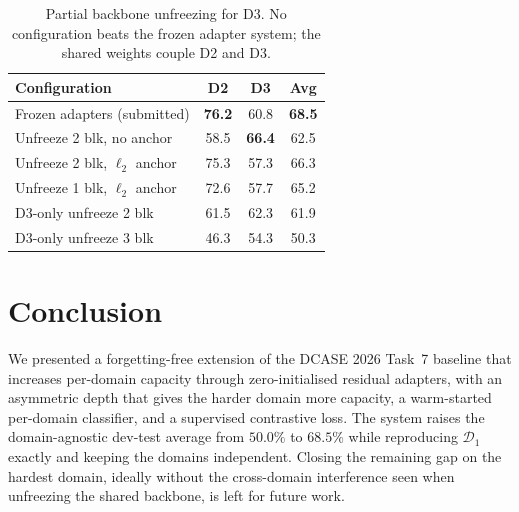 \documentclass{article}
\begin{document}
\begin{sloppy}
\begin{table}[t]
  \centering
  \caption{Partial backbone unfreezing for D3. No configuration beats the
           frozen adapter system; the shared weights couple D2 and D3.}
  \label{tab:unfreeze}
  \begin{tabularx}{\columnwidth}{Xccc}
    \toprule
    Configuration & D2 & D3 & Avg \\
    \midrule
    Frozen adapters (submitted)        & \textbf{76.2} & 60.8 & \textbf{68.5} \\
    Unfreeze 2 blk, no anchor          & 58.5 & \textbf{66.4} & 62.5 \\
    Unfreeze 2 blk, $\ell_2$ anchor    & 75.3 & 57.3 & 66.3 \\
    Unfreeze 1 blk, $\ell_2$ anchor    & 72.6 & 57.7 & 65.2 \\
    D3-only unfreeze 2 blk             & 61.5 & 62.3 & 61.9 \\
    D3-only unfreeze 3 blk             & 46.3 & 54.3 & 50.3 \\
    \bottomrule
  \end{tabularx}
\end{table}


\section{Conclusion}
\label{sec:conclusion}

We presented a forgetting-free extension of the DCASE 2026 Task~7 baseline
that increases per-domain capacity through zero-initialised residual
adapters, with an asymmetric depth that gives the harder domain more
capacity, a warm-started per-domain classifier, and a supervised contrastive
loss. The system raises the domain-agnostic dev-test average from
$50.0\%$ to $68.5\%$ while reproducing $\mathcal{D}_1$ exactly and keeping
the domains independent. Closing the remaining gap on the hardest domain,
ideally without the cross-domain interference seen when unfreezing the shared
backbone, is left for future work.





\end{sloppy}
\end{document}
